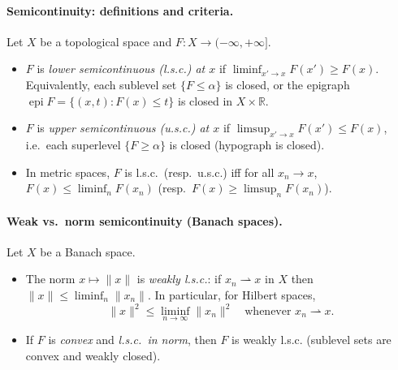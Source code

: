 \documentclass[12pt,a4paper]{article}
\theoremstyle{plain}
\theoremstyle{definition}
\theoremstyle{remark}
\theoremstyle{remark}
\theoremstyle{definition}
\begin{document}
	\paragraph{Semicontinuity: definitions and criteria.}
	Let $X$ be a topological space and $F:X\to(-\infty,+\infty]$.
	\begin{itemize}
		\item $F$ is \emph{lower semicontinuous (l.s.c.) at $x$} if
		$\displaystyle \liminf_{x'\to x} F(x') \ge F(x)$.
		Equivalently, each sublevel set $\{F\le \alpha\}$ is closed, or
		the epigraph $\operatorname{epi}F=\{(x,t):F(x)\le t\}$ is closed in $X\times\mathbb R$.
		\item $F$ is \emph{upper semicontinuous (u.s.c.) at $x$} if
		$\displaystyle \limsup_{x'\to x} F(x') \le F(x)$, i.e.\ each superlevel
		$\{F\ge \alpha\}$ is closed (hypograph is closed).
		\item In metric spaces, $F$ is l.s.c.\ (resp.\ u.s.c.) iff for all $x_n\to x$,
		$\displaystyle F(x)\le\liminf_n F(x_n)$ (resp.\ $\displaystyle F(x)\ge\limsup_n F(x_n)$).
	\end{itemize}
	
	\paragraph{Weak vs.\ norm semicontinuity (Banach spaces).}
	Let $X$ be a Banach space.
	\begin{itemize}
		\item The norm $x\mapsto\|x\|$ is \emph{weakly l.s.c.}: if $x_n\rightharpoonup x$ in $X$ then
		$\|x\|\le \liminf_n \|x_n\|$. In particular, for Hilbert spaces,
		\[
		\|x\|^2 \le \liminf_{n\to\infty}\|x_n\|^2
		\quad\text{whenever } x_n\rightharpoonup x .
		\]
		\item If $F$ is \emph{convex} and \emph{l.s.c.\ in norm}, then $F$ is weakly l.s.c.
		(sublevel sets are convex and weakly closed).
	\end{itemize}
	
\end{document}
